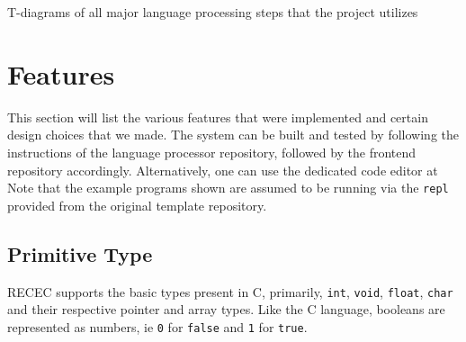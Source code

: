 \documentclass[a4paper]{article}
\begin{document}
T-diagrams of all major language processing steps that the project utilizes

\section{Features}


This section will list the various features that were implemented and certain design choices that we made. The system can be built and tested by following the instructions of the language processor repository, followed by the frontend repository accordingly. Alternatively, one can use the dedicated code editor at %
\\

Note that the example programs shown are assumed to be running via the \texttt{repl} provided from the original template repository. 

\subsection{Primitive Type}
RECEC supports the basic types present in C, primarily, \texttt{int}, \texttt{void}, \texttt{float}, \texttt{char} and their respective pointer and array types. Like the C language, booleans are represented as numbers, ie \texttt{0} for \texttt{false} and \texttt{1} for \texttt{true}.
\end{document}

